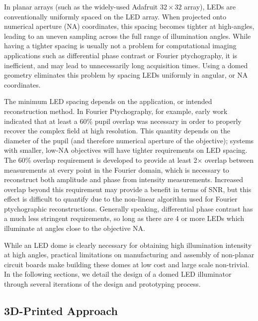 In planar arrays (such as the widely-used Adafruit $32 \times 32$ array), LEDs are conventionally uniformly spaced on the LED array. When projected onto numerical aperture (NA) coordinates, this spacing becomes tighter at high-angles, leading to an uneven sampling across the full range of illumination angles. While having a tighter spacing is usually not a problem for computational imaging applications such as differential phase contrast or Fourier ptychography, it is inefficient, and may lead to unnecessarily long acquisition times. Using a domed geometry eliminates this problem by spacing LEDs uniformly in angular, or NA coordinates. 

The minimum LED spacing depends on the application, or intended reconstruction method. In Fourier Ptychography, for example, early work~\cite{Zheng2013, Tian14, Guo:15} indicated that at least a 60\% pupil overlap was necessary in order to properly recover the complex field at high resolution. This quantity depends on the diameter of the pupil (and therefore numerical aperture of the objective); systems with smaller, low-NA objectives will have tighter requirements on LED spacing. The 60\% overlap requirement is developed to provide at least 2$\times$ overlap between measurements at every point in the Fourier domain, which is necessary to reconstruct both amplitude and phase from intensity measurements. Increased overlap beyond this requirement may provide a benefit in terms of SNR, but this effect is difficult to quantify due to the non-linear algorithm used for Fourier ptychographic reconstructions. Generally speaking, differential phase contrast has a much less stringent requirements, so long as there are 4 or more LEDs which illuminate at angles close to the objective NA.

While an LED dome is clearly necessary for obtaining high illumination intensity at high angles, practical limitations on manufacturing and assembly of non-planar circuit boards make building these domes at low cost and large scale non-trivial. In the following sections, we detail the design of a domed LED illuminator through several iterations of the design and prototyping process.

\subsection{3D-Printed Approach}\label{sec:fabrication:ccsdome}

